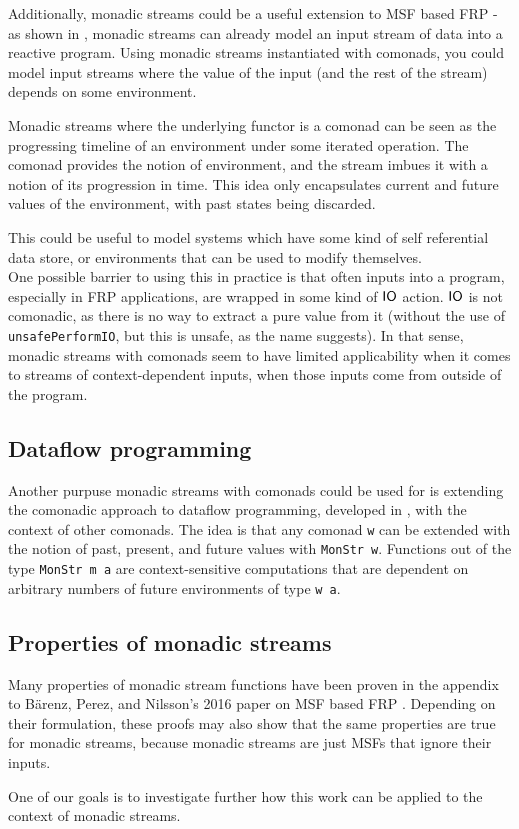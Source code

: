 Additionally, monadic streams could be a useful extension to MSF based FRP - as shown in \cite{frp_refactored}, monadic streams can already model an input stream of data into a reactive program. Using monadic streams instantiated with comonads, you could model input streams where the value of the input (and the rest of the stream) depends on some environment. 

Monadic streams where the underlying functor is a comonad can be seen as the progressing timeline of an environment under some iterated operation. The comonad provides the notion of environment, and the stream imbues it with a notion of its progression in time. This idea only encapsulates current and future values of the environment, with past states being discarded.

This could be useful to model systems which have some kind of self referential data store, or environments that can be used to modify themselves. \\

One possible barrier to using this in practice is that often inputs into a program, especially in FRP applications, are wrapped in some kind of $\mathsf{IO}$ action. $\mathsf{IO}$ is not comonadic, as there is no way to extract a pure value from it (without the use of \verb+unsafePerformIO+, but this is unsafe, as the name suggests). In that sense, monadic streams with comonads seem to have limited applicability when it comes to streams of context-dependent inputs, when those inputs come from outside of the program.


\subsection{Dataflow programming}

Another purpuse monadic streams with comonads could be used for is extending the comonadic approach to dataflow programming, developed in \cite{essence_of_dataflow}, with the context of other comonads. The idea is that any comonad \verb+w+ can be extended with the notion of past, present, and future values with \verb+MonStr w+. Functions out of the type \verb+MonStr m a+ are context-sensitive computations that are dependent on arbitrary numbers of future environments of type \verb+w a+.

\subsection{Properties of monadic streams}

Many properties of monadic stream functions have been proven in the appendix \cite{msf_properties} to Bärenz, Perez, and Nilsson's 2016 paper on MSF based FRP \cite{frp_refactored}. Depending on their formulation, these proofs may also show that the same properties are true for monadic streams, because monadic streams are just MSFs that ignore their inputs. 

One of our goals is to investigate further how this work can be applied to the context of monadic streams.
